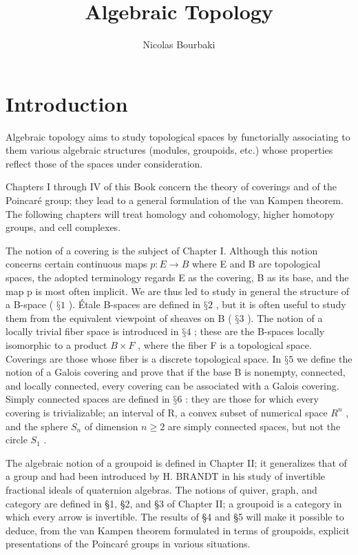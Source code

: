 \documentclass[12pt,a4paper,oneside]{book}
\title{Algebraic Topology}
\author{Nicolas Bourbaki}
\date{}
\newcommand{\specialchapter}[1]{%
  \chapter*{#1}%
  \phantomsection
  \addcontentsline{toc}{chapter}{#1}%
}
\begin{document}
\maketitle
\clearpage
\frontmatter
\tableofcontents
\specialchapter{Introduction}

Algebraic topology aims to study topological spaces by functorially associating to them various algebraic structures (modules, groupoids, etc.) whose properties reflect those of the spaces under consideration.

Chapters I through IV of this Book concern the theory of coverings and of the Poincaré group; they lead to a general formulation of the van Kampen theorem. The following chapters will treat homology and cohomology, higher homotopy groups, and cell complexes.

The notion of a covering is the subject of Chapter I. Although this notion concerns certain continuous maps \(p: E \rightarrow B\) where E and B are topological spaces, the adopted terminology regards E as the covering, B as its base, and the map p is most often implicit. We are thus led to study in general the structure of a B-space ( \(§1\) ). Étale B-spaces are defined in \(§2\) , but it is often useful to study them from the equivalent viewpoint of sheaves on B ( \(§3\) ). The notion of a locally trivial fiber space is introduced in \(§4\) ; these are the B-spaces locally isomorphic to a product \(B \times F\) , where the fiber F is a topological space. Coverings are those whose fiber is a discrete topological space. In \(§5\) we define the notion of a Galois covering and prove that if the base B is nonempty, connected, and locally connected, every covering can be associated with a Galois covering. Simply connected spaces are defined in \(§6\) : they are those for which every covering is trivializable; an interval of R, a convex subset of numerical space \(R^{n}\) , and the sphere \(S_{n}\) of dimension \(n \geqslant 2\) are simply connected spaces, but not the circle \(S_{1}\) .

The algebraic notion of a groupoid is defined in Chapter II; it generalizes that of a group and had been introduced by H. BRANDT in his study of invertible fractional ideals of quaternion algebras. The notions of quiver, graph, and category are defined in §1, §2, and §3 of Chapter II; a groupoid is a category in which every arrow is invertible. The results of §4 and §5 will make it possible to deduce, from the van Kampen theorem formulated in terms of groupoids, explicit presentations of the Poincaré groups in various situations.
\end{document}

